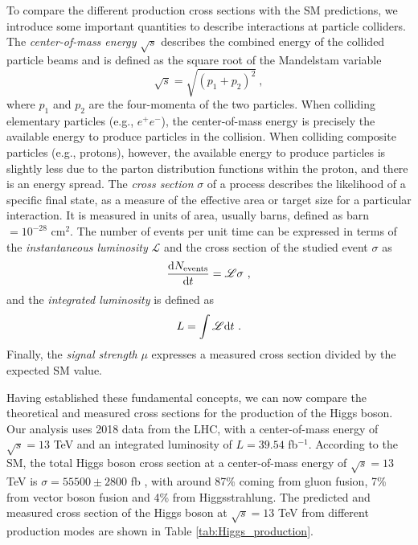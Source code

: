 To compare the different production cross sections with the SM predictions, we introduce some important quantities to describe interactions at particle colliders. The \textit{center-of-mass energy} $\sqrt{s}$ describes the combined energy of the collided particle beams and is defined as the square root of the Mandelstam variable
\begin{equation*}
\sqrt{s} = \sqrt{(p_1+p_2)^2}\ ,
\end{equation*}
where $p_1$ and $p_2$ are the four-momenta of the two particles. When colliding elementary particles (e.g., $e^+e^-$), the center-of-mass energy is precisely the available energy to produce particles in the collision. When colliding composite particles (e.g., protons), however, the available energy to produce particles is slightly less due to the parton distribution functions within the proton, and there is an energy spread. The \textit{cross section} $\sigma$ of a process describes the likelihood of a specific final state, as a measure of the effective area or target size for a particular interaction. It is measured in units of area, usually barns, defined as barn $= 10^{-28}$ cm$^{2}$. The number of events per unit time can be expressed in terms of the \textit{instantaneous luminosity} $\mathscr{L}$ and the cross section of the studied event $\sigma$ as
\begin{equation*}
    \frac{\text{d} N_{\text{events}}}{\text{d} t} = \mathscr{L}\sigma\ ,
\end{equation*}
and the \textit{integrated luminosity} is defined as 
\begin{equation*}
    L = \int\mathscr{L}\d t\ .
\end{equation*}
Finally, the \textit{signal strength} $\mu$ expresses a measured cross section divided by the expected SM value.

Having established these fundamental concepts, we can now compare the theoretical and measured cross sections for the production of the Higgs boson. Our analysis uses 2018 data from the LHC, with a center-of-mass energy of $\sqrt{s} = 13$ TeV and an integrated luminosity of $L=39.54$ fb$^{-1}$. According to the SM, the total Higgs boson cross section at a center-of-mass energy of $\sqrt{s} = 13$ TeV is $\sigma = 55500 \pm 2800$ fb \cite{LHCHiggsCrossSectionWorkingGroup:2016ypw}, with around 87\% coming from gluon fusion, 7\% from vector boson fusion and 4\% from Higgsstrahlung. The predicted and measured cross section of the Higgs boson at $\sqrt{s} = 13$ TeV from different production modes are shown in Table \ref{tab:Higgs_production}.

